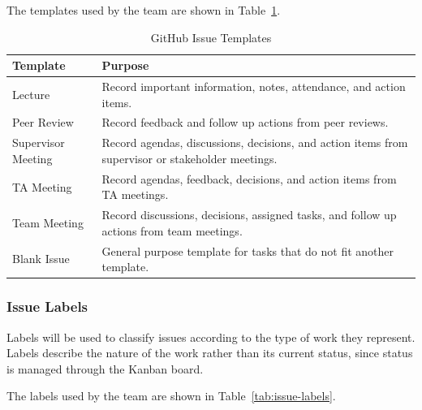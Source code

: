 \documentclass{article}
\begin{document}
The templates used by the team are shown in Table~\ref{tab:issue-templates}.

\begin{table}[H]
    \centering
    \begin{tabular}{|l|p{8.5cm}|}
        \hline
        \textbf{Template} & \textbf{Purpose} \\ \hline

        Lecture &
        Record important information, notes, attendance, and action items. \\ \hline

        Peer Review &
        Record feedback and follow up actions from peer reviews. \\ \hline

        Supervisor Meeting &
        Record agendas, discussions, decisions, and action items from
        supervisor or stakeholder meetings. \\ \hline

        TA Meeting &
        Record agendas, feedback, decisions, and action items from TA
        meetings. \\ \hline

        Team Meeting &
        Record discussions, decisions, assigned tasks, and follow up actions
        from team meetings. \\ \hline

        Blank Issue &
        General purpose template for tasks that do not fit another template. \\ \hline
    \end{tabular}

    \caption{GitHub Issue Templates}
    \label{tab:issue-templates}
\end{table}


\subsubsection{Issue Labels}

Labels will be used to classify issues according to the type of work they
represent. Labels describe the nature of the work rather than its current
status, since status is managed through the Kanban board.

The labels used by the team are shown in Table~\ref{tab:issue-labels}.
\end{document}
